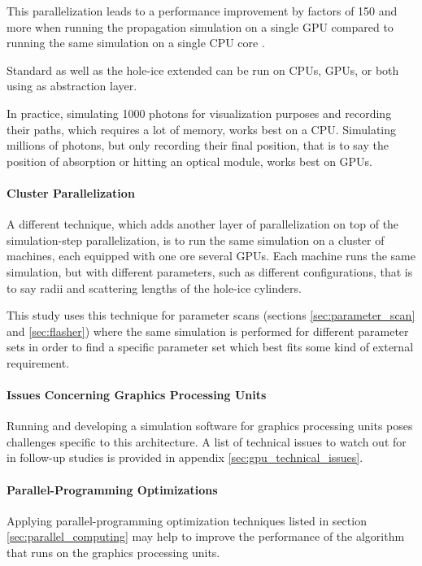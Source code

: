 This parallelization leads to a performance improvement by factors of 150 and more when running the propagation simulation on a single GPU compared to running the same simulation on a single CPU core \cite{ppcpaper}.

Standard \clsim as well as the hole-ice extended \clsim can be run on CPUs, GPUs, or both using  as abstraction layer.

In practice, simulating 1000 photons for visualization purposes and recording their paths, which requires a lot of memory, works best on a CPU. Simulating millions of photons, but only recording their final position, that is to say the position of absorption or hitting an optical module, works best on GPUs.


\paragraph{Cluster Parallelization}
\label{sec:cluster_parallelization}
A different technique, which adds another layer of parallelization on top of the simulation-step parallelization, is to run the same simulation on a cluster of machines, each equipped with one ore several GPUs. Each machine runs the same simulation, but with different parameters, such as different configurations, that is to say radii and scattering lengths of the hole-ice cylinders.

This study uses this technique for parameter scans (sections \ref{sec:parameter_scan} and \ref{sec:flasher}) where the same simulation is performed for different parameter sets in order to find a specific parameter set which best fits some kind of external requirement.


\paragraph{Issues Concerning Graphics Processing Units}
Running and developing a simulation software for graphics processing units poses challenges specific to this architecture. A list of technical issues to watch out for in follow-up studies is provided in appendix \ref{sec:gpu_technical_issues}.


\paragraph{Parallel-Programming Optimizations}
Applying parallel-programming optimization techniques listed in section \ref{sec:parallel_computing} may help to improve the performance of the algorithm that runs on the graphics processing units.

